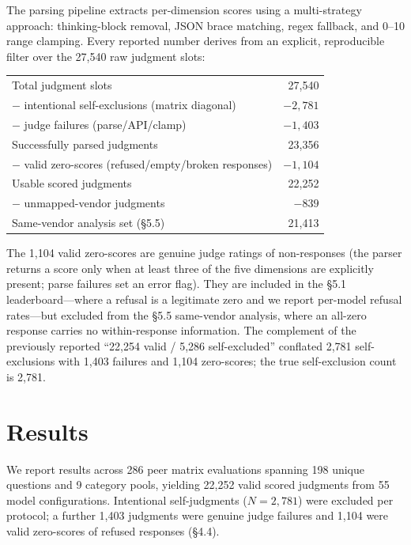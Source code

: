 \documentclass{article}
\begin{document}
The parsing pipeline extracts per-dimension scores using a multi-strategy approach: thinking-block removal, JSON brace matching, regex fallback, and 0--10 range clamping. Every reported number derives from an explicit, reproducible filter over the 27,540 raw judgment slots:
\begin{center}
\begin{tabular}{lr}
\toprule
Total judgment slots & 27,540 \\
\quad $-$ intentional self-exclusions (matrix diagonal) & $-2{,}781$ \\
\quad $-$ judge failures (parse/API/clamp) & $-1{,}403$ \\
\midrule
Successfully parsed judgments & 23,356 \\
\quad $-$ valid zero-scores (refused/empty/broken responses) & $-1{,}104$ \\
\midrule
Usable scored judgments & 22,252 \\
\quad $-$ unmapped-vendor judgments & $-839$ \\
\midrule
Same-vendor analysis set (\S5.5) & 21,413 \\
\bottomrule
\end{tabular}
\end{center}
The 1,104 valid zero-scores are genuine judge ratings of non-responses (the parser returns a score only when at least three of the five dimensions are explicitly present; parse failures set an error flag). They are included in the \S5.1 leaderboard---where a refusal is a legitimate zero and we report per-model refusal rates---but excluded from the \S5.5 same-vendor analysis, where an all-zero response carries no within-response information. The complement of the previously reported ``22,254 valid / 5,286 self-excluded'' conflated 2,781 self-exclusions with 1,403 failures and 1,104 zero-scores; the true self-exclusion count is 2,781.


\section{Results}

We report results across 286 peer matrix evaluations spanning 198 unique questions and 9 category pools, yielding 22,252 valid scored judgments from 55 model configurations. Intentional self-judgments ($N = 2{,}781$) were excluded per protocol; a further 1,403 judgments were genuine judge failures and 1,104 were valid zero-scores of refused responses (\S4.4).
\end{document}

